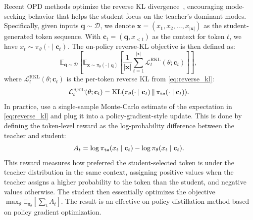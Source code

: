 Recent OPD methods optimize the reverse KL divergence~\cite{gu2024minillm, lu2025onpolicydistillation}, encouraging mode-seeking behavior that helps the student focus on the teacher's dominant modes. 
Specifically, given inputs $\mathbf{q}\sim\mathcal{D}$, %
we denote $\mathbf{x} = (x_1, x_2, \ldots, x_{|\mathbf{x}|})$ as the student-generated token sequence.
With $\mathbf{c}_t = (\mathbf{q},x_{<t})$ as the context for token $t$, we have $x_t\sim\pi_{\theta}(\cdot\mid\mathbf{c}_t)$. %
The on-policy reverse-KL objective is then defined as:
\begin{equation}\label{eq:opd_ideal}
\mathbb{E}_{\mathbf{q}\sim\mathcal{D}}\left[
\mathbb{E}_{\mathbf{x}\sim\pi_{\theta}(\cdot\mid\mathbf{q})} \left[
\frac{1}{|\mathbf{x}|}\sum_{t=1}^{|\mathbf{x}|}\mathcal{L}_{t}^{\textrm{RKL}}(\theta;\mathbf{c}_t)
\right]
\right],
\end{equation}
where $\mathcal{L}_{t}^{\textrm{RKL}}(\theta;\mathbf{c}_t)$ is the per-token reverse KL from \eqref{eq:reverse_kl}:
\begin{equation}
\mathcal{L}_{t}^{\textrm{RKL}}(\theta;\mathbf{c}_t) = \mathrm{KL}(\pi_\theta(\cdot\mid\mathbf{c}_t) \,\|\, \pi_{\tt{te}}(\cdot\mid\mathbf{c}_t)).
\end{equation}
In practice, \citet{lu2025onpolicydistillation} use a single-sample Monte‑Carlo estimate of the expectation in \eqref{eq:reverse_kl} and plug it into a policy‑gradient-style update. This is done by defining the token-level reward as the log-probability difference between the teacher and student:
\begin{equation} \label{eq:per_token_reward}
A_t
=
\log \pi_{\tt{te}}(x_t \mid \mathbf{c}_t)
-
\log \pi_{\theta}(x_t \mid \mathbf{c}_t).
\end{equation}
This reward measures how preferred the student-selected token is under the teacher distribution in the same context, assigning positive values when the teacher assigns a higher probability to the token than the student, and negative values otherwise.
The student then essentially optimizes the objective $\max_{\theta}\mathbb{E}_{\pi_{\theta}}\left[\sum_t A_t\right]$.
The result is an effective on-policy distillation method based on policy gradient optimization.

